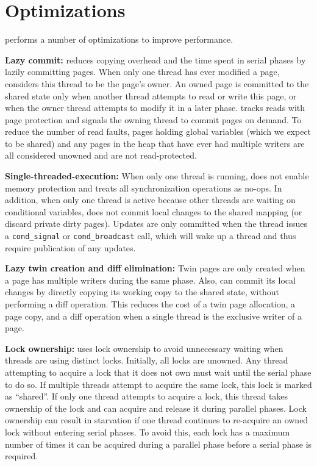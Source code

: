 \section{Optimizations}
\label{sec:dthreads-optimization}

\dthreads{} performs a number of optimizations to improve performance.

\textbf{Lazy commit:} \dthreads{} reduces copying overhead and the time spent in serial phases by lazily committing pages. When only one thread has ever modified a page, \dthreads{} considers this thread to be the page’s owner. An owned page is committed to the shared state only when another thread attempts to read or write this page, or when the owner thread attempts to modify it in a later phase. \dthreads{} tracks reads with page protection and signals the owning thread to commit pages on demand. To reduce the number of read faults, pages holding global variables (which we expect to be shared) and any pages in the heap that have ever had multiple writers are all considered unowned and are not read-protected.

\textbf{Single-threaded-execution: }
When only one thread is running, \dthreads{} does not enable memory protection and treats all synchronization operations as no-ops. In addition, when only one thread is active because other threads are waiting on conditional variables, \dthreads{} does not commit local changes to the shared mapping (or discard private dirty pages). Updates are only committed when the thread issues a \texttt{cond\_signal} or \texttt{cond\_broadcast} call, which will wake up a thread and thus require publication of any updates.

\textbf{Lazy twin creation and diff elimination: }
Twin pages are only created when a page has multiple writers during the same phase. Also, \dthreads{} can commit its local changes by directly copying its working copy to the shared state, without performing a diff operation. This reduces the cost of a twin page allocation, a page copy, and a diff operation when a single thread is the exclusive writer of a page.

\textbf{Lock ownership:} \dthreads{} uses lock ownership to avoid unnecessary waiting when threads are using distinct locks. Initially, all locks are unowned. Any thread attempting to acquire a lock that it does not own must wait until the serial phase to do so. If multiple threads attempt to acquire the same lock, this lock is marked as ``shared''. If only one thread attempts to acquire a lock, this thread takes ownership of the lock and can acquire and release it during parallel phases. Lock ownership can result in starvation if one thread continues to re-acquire an owned lock without entering serial phases. To avoid this, each lock has a maximum number of times it can be acquired during a parallel phase before a serial phase is required.

